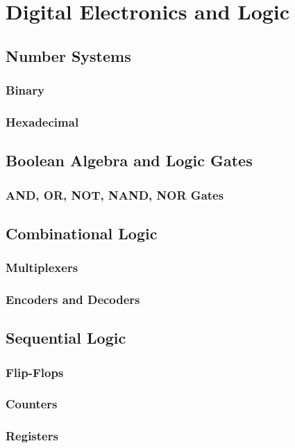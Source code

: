 \documentclass[11pt]{article}
\begin{document}
\section{Digital Electronics and Logic} \label{sec:digital_electronics}
\subsection{Number Systems} \label{subsec:number_systems}
\subsubsection{Binary}
\subsubsection{Hexadecimal}
\subsection{Boolean Algebra and Logic Gates} \label{subsec:boolean_logic}
\subsubsection{AND, OR, NOT, NAND, NOR Gates}
\subsection{Combinational Logic} \label{subsec:combinational_logic}
\subsubsection{Multiplexers}
\subsubsection{Encoders and Decoders}
\subsection{Sequential Logic} \label{subsec:sequential_logic}
\subsubsection{Flip-Flops}
\subsubsection{Counters}
\subsubsection{Registers}
\end{document}
